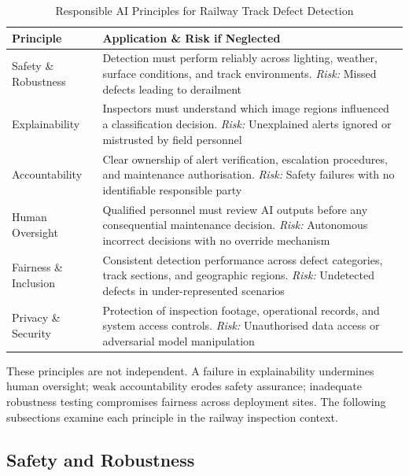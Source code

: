 \documentclass[conference]{IEEE}
\begin{document}
\begin{table}[ht]
\caption{Responsible AI Principles for Railway Track Defect Detection}
\label{tab:rai_principles}
\centering
\renewcommand{\arraystretch}{1.2}
\begin{tabular}{|p{2.4cm}|p{5.4cm}|}
\hline
\bfseries Principle & \bfseries Application \& Risk if Neglected \\
\hline
Safety \& Robustness & Detection must perform reliably across lighting, weather, surface conditions, and track environments. \newline \textit{Risk:} Missed defects leading to derailment \\
\hline
Explainability & Inspectors must understand which image regions influenced a classification decision. \newline \textit{Risk:} Unexplained alerts ignored or mistrusted by field personnel \\
\hline
Accountability & Clear ownership of alert verification, escalation procedures, and maintenance authorisation. \newline \textit{Risk:} Safety failures with no identifiable responsible party \\
\hline
Human Oversight & Qualified personnel must review AI outputs before any consequential maintenance decision. \newline \textit{Risk:} Autonomous incorrect decisions with no override mechanism \\
\hline
Fairness \& Inclusion & Consistent detection performance across defect categories, track sections, and geographic regions. \newline \textit{Risk:} Undetected defects in under-represented scenarios \\
\hline
Privacy \& Security & Protection of inspection footage, operational records, and system access controls. \newline \textit{Risk:} Unauthorised data access or adversarial model manipulation \\
\hline
\end{tabular}
\end{table}

These principles are not independent. A failure in explainability undermines human oversight; weak accountability erodes safety assurance; inadequate robustness testing compromises fairness across deployment sites. The following subsections examine each principle in the railway inspection context.

\subsection{Safety and Robustness}
\end{document}
